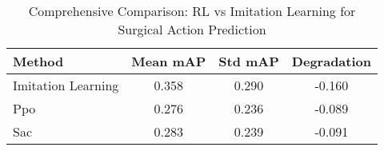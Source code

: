 
\begin{table}[htbp]
\centering
\caption{Comprehensive Comparison: RL vs Imitation Learning for Surgical Action Prediction}
\label{tab:main_results}
\begin{tabular}{lccc}
\toprule
Method & Mean mAP & Std mAP & Degradation \\
\midrule
Imitation Learning & 0.358 & 0.290 & -0.160 \\
Ppo & 0.276 & 0.236 & -0.089 \\
Sac & 0.283 & 0.239 & -0.091 \\

\bottomrule
\end{tabular}
\end{table}
